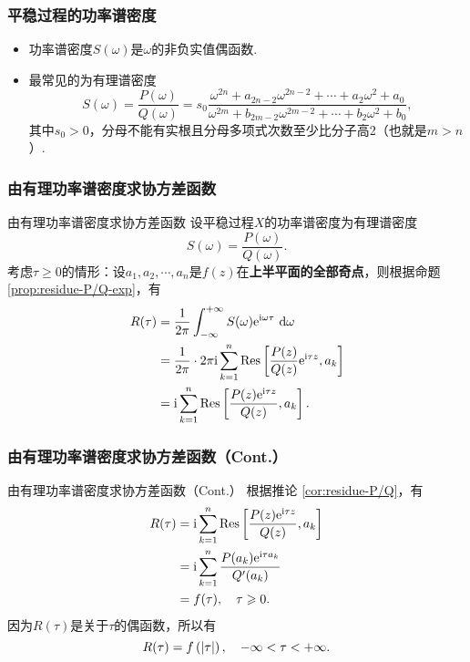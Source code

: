 \begin{frame}
    \frametitle{平稳过程的功率谱密度}
    \begin{myproposition}[功率谱密度的必要条件]
        \begin{itemize}
            \item 功率谱密度$S(\omega)$是$\omega$的非负实值偶函数. 
            \item 最常见的为有理谱密度
            \begin{equation*}
                S(\omega)=\frac{P(\omega)}{Q(\omega)}=s_0\frac{\omega^{2n}+a_{2n-2}\omega^{2n-2}+\cdots+a_2\omega^2+a_0}{\omega^{2m}+b_{2m-2}\omega^{2m-2}+\cdots+b_2\omega^2+b_0},
            \end{equation*}
            其中$s_0>0$，分母不能有实根且分母多项式次数至少比分子高2（也就是$m>n$）. 
        \end{itemize}
    \end{myproposition}
\end{frame}

\begin{frame}
    \frametitle{由有理功率谱密度求协方差函数}
    \begin{exampleblock}{由有理功率谱密度求协方差函数}
        设平稳过程$X$的功率谱密度为有理谱密度
        \begin{equation*}
            S(\omega)=\frac{P(\omega)}{Q(\omega)}.
        \end{equation*}
        考虑$\tau\geqslant 0$的情形：设$a_1,a_2,\cdots,a_n$是$f(z)$在\textbf{上半平面的全部奇点}，则根据命题 \ref{prop:residue-P/Q-exp}，有
        \small
        \begin{align}
            R(\tau)&=\frac1{2\pi}\int_{-\infty}^{+\infty}S(\omega)\mathrm e^{\mathrm i\omega\tau}\ \mathrm d\omega\notag\\
            &=\frac1{2\pi}\cdot 2\pi\mathrm i\sum_{k=1}^n\mathrm{Res}\left[\frac{P(z)}{Q(z)}\mathrm e^{\mathrm i\tau z}, a_k\right]\notag\\
            &=\mathrm i\sum_{k=1}^n\mathrm{Res}\left[\frac{P(z)\mathrm e^{\mathrm i\tau z}}{Q(z)}, a_k\right].
        \end{align}
    \end{exampleblock}
\end{frame}

\begin{frame}
    \frametitle{由有理功率谱密度求协方差函数（Cont.）}
    \begin{exampleblock}{由有理功率谱密度求协方差函数（Cont.）}
        根据推论 \ref{cor:residue-P/Q}，有
        \begin{align}
            R(\tau)&=\mathrm i\sum_{k=1}^n\mathrm{Res}\left[\frac{P(z)\mathrm e^{\mathrm i\tau z}}{Q(z)}, a_k\right]\notag\\
            &=\mathrm i\sum_{k=1}^n\frac{P(a_k)\mathrm e^{\mathrm i\tau a_k}}{Q'(a_k)}\\
            &=f(\tau),\quad \tau\geqslant 0\notag.
        \end{align}
        因为$R(\tau)$是关于$\tau$的偶函数，所以有
        \begin{equation}
            R(\tau)=f\left(\left\lvert\tau\right\rvert\right),\quad -\infty<\tau<+\infty. 
        \end{equation}
    \end{exampleblock}
\end{frame}